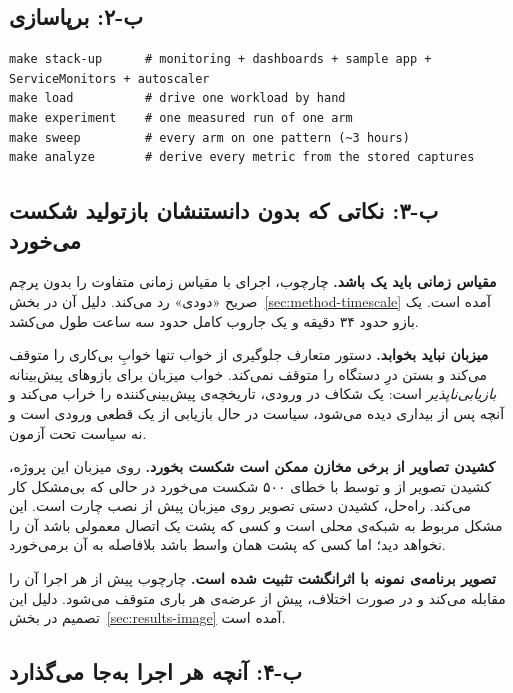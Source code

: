 \subsection*{ب-۲: برپاسازی}

\begin{latin}
\begin{lstlisting}
make stack-up      # monitoring + dashboards + sample app + ServiceMonitors + autoscaler
make load          # drive one workload by hand
make experiment    # one measured run of one arm
make sweep         # every arm on one pattern (~3 hours)
make analyze       # derive every metric from the stored captures
\end{lstlisting}
\end{latin}

\subsection*{ب-۳: نکاتی که بدون دانستنشان بازتولید شکست می‌خورد}

\textbf{مقیاس زمانی باید یک باشد.} چارچوب، اجرای با مقیاس زمانی متفاوت را بدون پرچم صریح
«دودی» رد می‌کند. دلیل آن در بخش~\ref{sec:method-timescale} آمده است. یک بازو حدود ۳۴ دقیقه و
یک جاروب کامل حدود سه ساعت طول می‌کشد.

\textbf{میزبان نباید بخوابد.} دستور متعارف جلوگیری از خواب تنها خوابِ بی‌کاری را متوقف
می‌کند و بستن درِ دستگاه را متوقف نمی‌کند. خواب میزبان برای بازوهای پیش‌بینانه \emph{بازیابی‌ناپذیر}
است: یک شکاف در ورودی، تاریخچه‌ی پیش‌بینی‌کننده را خراب می‌کند و آنچه پس از بیداری دیده
می‌شود، سیاست در حال بازیابی از یک قطعی ورودی است و نه سیاست تحت آزمون.

\textbf{کشیدن تصاویر از برخی مخازن ممکن است شکست بخورد.} روی میزبان این پروژه، کشیدن تصویر از
 و  توسط  با خطای ۵۰۰ شکست می‌خورد در حالی که
 بی‌مشکل کار می‌کند. راه‌حل، کشیدن دستی تصویر روی میزبان پیش از نصب چارت
است. این مشکل مربوط به شبکه‌ی محلی است و کسی که پشت یک اتصال معمولی باشد آن را نخواهد دید؛ اما
کسی که پشت همان واسط باشد بلافاصله به آن برمی‌خورد.

\textbf{تصویر برنامه‌ی نمونه با اثرانگشت تثبیت شده است.} چارچوب پیش از هر اجرا آن را مقابله
می‌کند و در صورت اختلاف، پیش از عرضه‌ی هر باری متوقف می‌شود. دلیل این تصمیم در
بخش~\ref{sec:results-image} آمده است.

\subsection*{ب-۴: آنچه هر اجرا به‌جا می‌گذارد}

